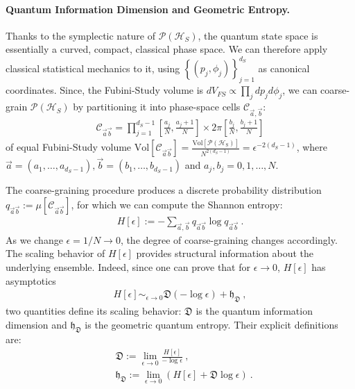 \documentclass[draft,nofootinbib,pre,twocolumn,showpacs,showkeys,groupaddress,preprintnumbers,floatfix]{revtex4-1}
\newcommand{\1}{\mathbbm{1}}
\begin{document}
\paragraph*{Quantum Information Dimension and Geometric Entropy.}
Thanks to the symplectic nature of $\mathcal{P}(\mathcal{H}_S)$, the quantum
state space is essentially a curved, compact, classical phase space. We can therefore
apply classical statistical mechanics to it, using
$\left\{(p_j,\phi_j)\right\}_{j=1}^{d_S}$ as canonical coordinates. Since, the
Fubini-Study volume is $dV_{FS} \propto \prod_j dp_j d\phi_j$, we can
coarse-grain $\mathcal{P}(\mathcal{H}_S)$ by partitioning it into phase-space
cells $\mathcal{C}_{\vec{a},\vec{b}}$:
\begin{align*}
\mathcal{C}_{\vec{a}\vec{b}} = \prod_{j=1}^{d_S-1} \left[\frac{a_j}{N},\frac{a_{j}+1}{N}\right] \times 2\pi \left[\frac{b_j}{N},\frac{b_j+1}{N} \right]
\end{align*}
of equal Fubini-Study volume $\mathrm{Vol}\left[
\mathcal{C}_{\vec{a}\vec{b}}\right] =
\frac{\mathrm{Vol[\mathcal{P}(\mathcal{H}_S)]}}{N^{2({d_S-1})}} =
\epsilon^{-2(d_S-1)}$, where $\vec{a} = (a_1,\ldots,a_{d_S-1}),\vec{b} =
(b_1,\ldots,b_{d_S-1})$ and $a_j,b_j = 0,1,\ldots,N$.

The coarse-graining procedure produces a discrete probability distribution
$q_{\vec{a}\vec{b}} := \mu[\mathcal{C}_{\vec{a}\vec{b}}]$, for which we can
compute the Shannon entropy: 
\begin{align*}
H[\epsilon]:= - \sum_{\vec{a},\vec{b}} q_{\vec{a}\vec{b}}\log q_{\vec{a}\vec{b}}
  ~.
\end{align*}
As we change $\epsilon = 1/N \to 0$, the degree of coarse-graining changes accordingly. The scaling behavior of $H[\epsilon]$ provides structural
information about the underlying ensemble. Indeed, since one can prove that for $\epsilon \to 0$, $H[\epsilon]$ has asymptotics
\begin{align*}
H[\epsilon] \sim_{\epsilon \to 0} \mathfrak{D} \left( - \log \epsilon\right) + \mathfrak{h}_{\mathfrak{D}}
  ~,
\end{align*}
two quantities define its scaling behavior: $\mathfrak{D}$ is the quantum information dimension and 
$\mathfrak{h}_{\mathfrak{D}}$ is the geometric quantum entropy. Their explicit definitions are:
\begin{subequations}
\begin{align}
& \mathfrak{D}:= \lim_{\epsilon \to 0} \frac{H[\epsilon]}{- \log \epsilon}~, \\
& \mathfrak{h}_{\mathfrak{D}}:= \lim_{\epsilon \to 0} \left( H[\epsilon] + \mathfrak{D} \log{\epsilon} \right)
  ~.
\end{align}
\end{subequations}
\end{document}
